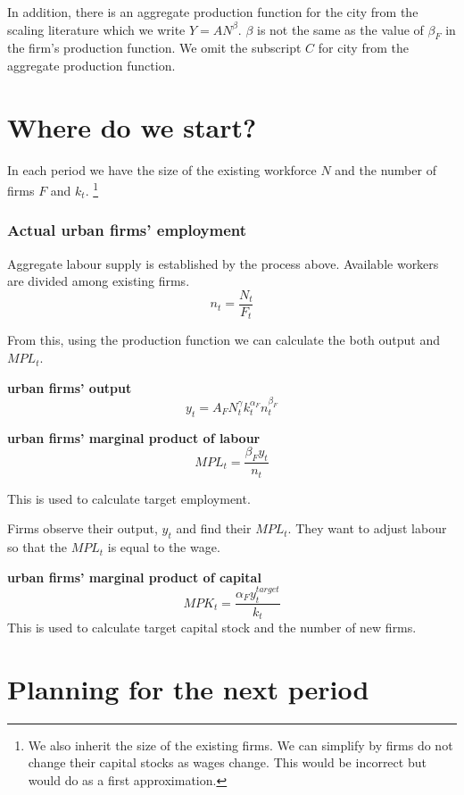 In addition, there is an aggregate production function for the city from the scaling literature which we write $Y=AN^\beta$. $\beta$ is not the same as the value of $\beta_F$ in the firm's production function. We omit the subscript $C$ for city from  the aggregate production function.    


\section{Where do we start?}
In each period we have the size of the existing workforce $N$ and the number of firms $F$ and $k_t$. \footnote{We also inherit the size of the existing firms. We can simplify by firms do not change their capital stocks as wages change. This would be incorrect but would do as a first approximation.}

\subsubsection{Actual urban firms' employment} 
Aggregate labour supply is established by the process  above.  Available workers are divided among existing firms.   \begin{equation}
    n_t= \frac{N_t}{F_t} 
\end{equation}

From this, using the production function we can calculate the both output and  $MPL_t$.

\textbf{urban firms' output}
\begin{equation}
    {y}_t=A_FN_t^\gamma k_t^{\alpha_F}n_t^{\beta_F} \label{eqn-urban-firm-output}
\end{equation}

\textbf{urban firms'  marginal product of labour}
\begin{equation}MPL_{t} = \frac{\beta_{F}{y}_{t}}{n_t}\end{equation} 

This is used to calculate target employment.

Firms observe their output, ${y}_t$ and find their $MPL_t$. They want to adjust labour so that the $MPL_t$ is equal to the wage. 

\textbf{urban firms'  marginal product of capital} 
\begin{equation} MPK_t = \frac{\alpha_{F}{y}_{t}^{target}}{k_{t}}\end{equation} 
This is used to calculate target capital stock and the number of new firms.


\section{Planning for the next period}


